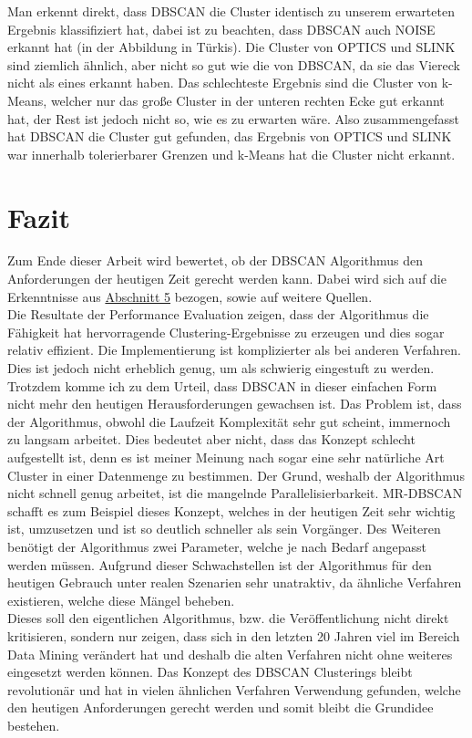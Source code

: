 \documentclass{lni}
\begin{document}
Man erkennt direkt, dass DBSCAN die Cluster identisch zu unserem erwarteten Ergebnis klassifiziert hat, dabei ist zu beachten, dass DBSCAN auch NOISE erkannt hat (in der Abbildung in Türkis). Die Cluster von OPTICS und SLINK sind ziemlich ähnlich, aber nicht so gut wie die von DBSCAN, da sie das Viereck nicht als eines erkannt haben. Das schlechteste Ergebnis sind die Cluster von k-Means, welcher nur das große Cluster in der unteren rechten Ecke gut erkannt hat, der Rest ist jedoch nicht so, wie es zu erwarten wäre.
Also zusammengefasst hat DBSCAN die Cluster gut gefunden, das Ergebnis von OPTICS und SLINK war innerhalb tolerierbarer Grenzen und k-Means hat die Cluster nicht erkannt.

%
%

\section{Fazit}
\label{sec:fazit}
Zum Ende dieser Arbeit wird bewertet, ob der DBSCAN Algorithmus den Anforderungen der heutigen Zeit gerecht werden kann. Dabei wird sich auf die Erkenntnisse aus \hyperref[sec:perf]{Abschnitt 5} bezogen, sowie auf weitere Quellen.\\
Die Resultate der Performance Evaluation zeigen, dass der Algorithmus die Fähigkeit hat hervorragende Clustering-Ergebnisse zu erzeugen und dies sogar relativ effizient. Die Implementierung ist komplizierter als bei anderen Verfahren. Dies ist jedoch nicht erheblich genug, um als schwierig eingestuft zu werden.\\
Trotzdem komme ich zu dem Urteil, dass DBSCAN in dieser einfachen Form nicht mehr den heutigen Herausforderungen gewachsen ist. Das Problem ist, dass der Algorithmus, obwohl die Laufzeit Komplexität sehr gut scheint, immernoch zu langsam arbeitet. Dies bedeutet aber nicht, dass das Konzept schlecht aufgestellt ist, denn es ist meiner Meinung nach sogar eine sehr natürliche Art Cluster in einer Datenmenge zu bestimmen. Der Grund, weshalb der Algorithmus nicht schnell genug arbeitet, ist die mangelnde Parallelisierbarkeit. MR-DBSCAN \cite{PARALLEL} schafft es zum Beispiel dieses Konzept, welches in der heutigen Zeit sehr wichtig ist, umzusetzen und ist so deutlich schneller als sein Vorgänger. Des Weiteren benötigt der Algorithmus zwei Parameter, welche je nach Bedarf angepasst werden müssen. Aufgrund dieser Schwachstellen ist der Algorithmus für den heutigen Gebrauch unter realen Szenarien sehr unatraktiv, da ähnliche Verfahren \cite{PPF} existieren, welche diese Mängel beheben.\\
Dieses soll den eigentlichen Algorithmus, bzw. die Veröffentlichung nicht direkt kritisieren, sondern nur zeigen, dass sich in den letzten 20 Jahren viel im Bereich Data Mining verändert hat und deshalb die alten Verfahren nicht ohne weiteres eingesetzt werden können. Das Konzept des DBSCAN Clusterings bleibt revolutionär und hat in vielen ähnlichen Verfahren Verwendung gefunden, welche den heutigen Anforderungen gerecht werden und somit bleibt die Grundidee bestehen.


\end{document}

